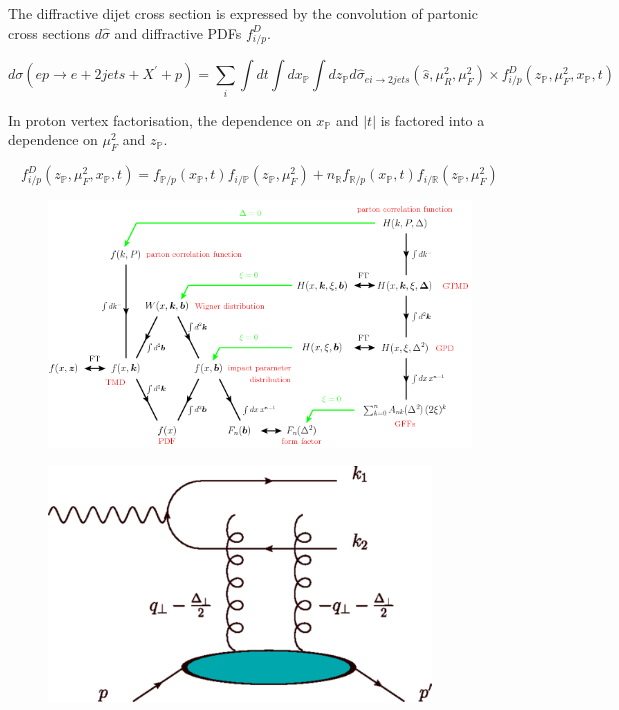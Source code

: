 The diffractive dijet cross section is expressed by the convolution of partonic cross sections $d\hat{\sigma}$ and diffractive PDFs $f^D_{i/p}$.

\begin{equation}
d\sigma (ep \rightarrow e + 2 jets + X^{'} + p) = \sum_{i} \int dt \int dx_\mathbb{P} \int dz_\mathbb{P} d\hat{\sigma}_{ei\rightarrow 2jets}(\hat{s},\mu^2_R,\mu^2_F)\times f^D_{i/p}(z_\mathbb{P},\mu^2_F,x_\mathbb{P},t)
\end{equation}

In proton vertex factorisation, the dependence on $x_{\mathbb{P}}$ and $|t|$ is factored into a dependence on $\mu^2_F$ and $z_{\mathbb{P}}$.

\begin{equation}
f^D_{i/p}(z_{\mathbb{P}},\mu^2_F,x_{\mathbb{P}},t) = f_{\mathbb{P}/p}(x_{\mathbb{P}},t)f_{i/\mathbb{P}}(z_{\mathbb{P}},\mu^2_F) + n_\mathbb{R}f_{\mathbb{R}/p}(x_{\mathbb{P}},t)f_{i/\mathbb{R}}(z_{\mathbb{P}},
\mu^2_F) 
\end{equation}

\begin{figure}[h!]
\begin{centering}
\includegraphics[width=7in]{Chapter2/importfigs/fig6_introGPD_TMD.png}
\par\end{centering}
\end{figure}

\begin{figure}[h!]
\begin{centering}
\includegraphics[width=4in]{Chapter2/importfigs/fig4_yatta.png}
\par\end{centering}
\end{figure}


